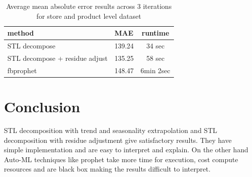 \documentclass[12pt,a4paper]{cibb}
\begin{document}
\begin{table}[httb!] \small
\centering
    \begin{tabularx}{0.8\textwidth}{ l  l  c }
        \toprule
          \textbf{method} & \textbf{MAE} & \textbf{runtime} \\
        \midrule
        \rowcolor{LightBlue} STL decompose & 139.24 & 34 sec \\
         STL decompose + residue adjust & 135.25 & 58 sec \\
        \rowcolor{LightBlue}  fbprophet & 148.47 & 6min 2sec\\
        \bottomrule
    \end{tabularx}
    \caption{
    Average mean absolute error results across 3 iterations for store and product level dataset\label{tab:RESULTS}}
\end{table}




\section{\bf Conclusion}
\label{sec:CONCLUSIONS}

STL decomposition with trend and seasonality extrapolation and STL decomposition with residue adjustment give satisfactory results. They have simple implementation and are easy to interpret and explain. On the other hand Auto-ML techniques like prophet take more time for execution, cost compute resources and are black box making the results difficult to interpret.

\footnotesize

 
\normalsize
\end{document}
